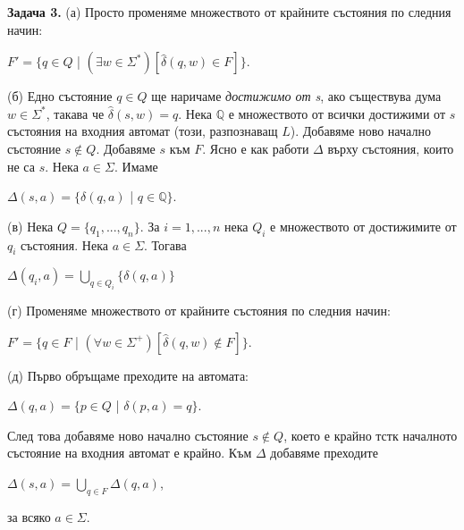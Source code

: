 \documentclass{article}
\begin{document}
    \textbf{Задача 3.} (а) Просто променяме множеството от крайните състояния по следния
    начин:
    \begin{center}
      $F' = \{q \in Q$ | $(\exists w \in \Sigma^*)[\hat{\delta}(q,w) \in F]\}$.
    \end{center}
    (б) Едно състояние $q \in Q$ ще наричаме \textit{достижимо от s}, ако съществува дума
    $w \in \Sigma^*$, такава че $\hat{\delta}(s,w) = q$. Нека $\mathbb{Q}$
    е множеството от всички достижими от $s$ състояния на входния автомат 
    (този, разпознаващ $L$). Добавяме ново начално състояние $s \notin Q$. Добавяме $s$ към $F$.
    Ясно е как работи $\Delta$ върху състояния, които не са $s$. Нека $a \in \Sigma$. Имаме
    \begin{center}
      $\Delta(s,a) = \{\delta(q,a)$ | $q \in \mathbb{Q}\}$.
    \end{center}
    (в) Нека $Q = \{q_1,...,q_n\}$. За $i=1,...,n$ нека $Q_i$ е множеството от достижимите
    от $q_i$ състояния. Нека $a \in \Sigma$. Тогава
    \begin{center}
      $\Delta(q_i,a) = \bigcup\limits_{q \in Q_i} \{\delta(q,a)\}$ 
    \end{center}
    (г) Променяме множеството от крайните състояния по следния начин:
    \begin{center}
      $F' = \{q \in F$ | $(\forall w \in \Sigma^+)[\hat{\delta}(q,w) \notin F]\}$.
    \end{center}
    (д) Първо обръщаме преходите на автомата:
    \begin{center}
      $\Delta(q,a) = \{p \in Q$ | $\delta(p,a) = q\}$.
    \end{center}
    След това добавяме ново начално състояние $s \notin Q$, което е крайно тстк началното
    състояние на входния автомат е крайно. Към $\Delta$ добавяме преходите
    \begin{center}
      $\Delta(s,a) = \bigcup\limits_{q \in F} \Delta(q,a)$,
    \end{center}
    за всяко $a \in \Sigma$.
\end{document}
